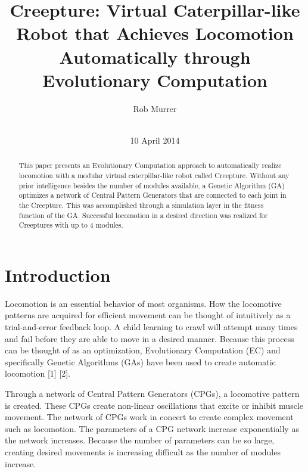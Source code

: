 \documentclass{acm_proc_article-sp}
\begin{document}
\title{Creepture: Virtual Caterpillar-like Robot that Achieves Locomotion
Automatically through Evolutionary Computation}

\author{
    \alignauthor
    Rob Murrer \\ 
    \\
   }

\date{10 April 2014}

\maketitle
\begin{abstract}
This paper presents an Evolutionary Computation approach to automatically
realize locomotion with a modular virtual caterpillar-like robot called
Creepture. Without any prior intelligence besides the number of modules
available, a Genetic Algorithm (GA) optimizes a network of Central
Pattern Generators that are connected to each joint in the Creepture.
This was accomplished through a simulation layer in the fitness function
of the GA. Successful locomotion in a desired direction was realized for
Creeptures with up to 4 modules.
\end{abstract}


\section{Introduction}
Locomotion is an essential behavior of most organisms. How the
locomotive patterns are acquired for efficient movement can be thought
of intuitively as a trial-and-error feedback loop. A child learning to
crawl will attempt many times and fail before they are able to move in a
desired manner. Because this process can be thought of as an
optimization, Evolutionary Computation (EC) and specifically Genetic
Algorithms (GAs) have been used to create automatic locomotion {[}1{]}
{[}2{]}.

Through a network of Central Pattern Generators (CPGs), a locomotive
pattern is created. These CPGs create non-linear oscillations that
excite or inhibit muscle movement. The network of CPGs work in concert
to create complex movement such as locomotion. The parameters of a CPG
network increase exponentially as the network increases. Because the
number of parameters can be so large, creating desired movements is
increasing difficult as the number of modules increase.
\end{document}
